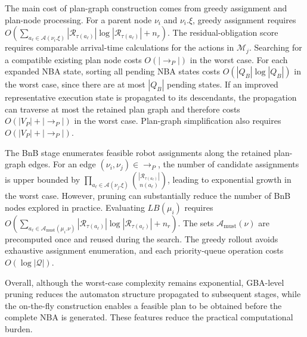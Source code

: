 \documentclass[lettersize,journal]{IEEEtran}
\theoremstyle{italiclemma}
\theoremstyle{italiclemma}
\theoremstyle{definition}
\begin{document}
The main cost of plan-graph construction comes from greedy assignment and plan-node processing. For a parent node $\nu_i$ and $\nu_i.\xi$, greedy assignment requires
$O(\sum_{a_\ell\in\mathcal A(\nu_i.\xi)}
|\mathcal R_{\tau(a_\ell)}|\log|\mathcal R_{\tau(a_\ell)}|+n_r)$. The residual-obligation score requires
comparable arrival-time calculations for the actions in $\mathcal M_j$. Searching for a compatible existing plan node costs $O(|\rightarrow_P|)$ in the worst case. For each expanded NBA state, sorting all pending NBA states costs $O(|Q_B|\log|Q_B|)$ in the worst case, since there are at most $|Q_B|$ pending states. If an improved representative execution state is propagated to its descendants, the propagation can traverse at most the retained plan graph and therefore costs $O(|V_P|+|\rightarrow_P|)$ in the worst case. Plan-graph simplification also requires $O(|V_P|+|\rightarrow_P|)$.

The BnB stage enumerates feasible robot assignments along the retained plan-graph edges. For an edge $(\nu_i,\nu_j)\in \rightarrow_P$, the number of candidate assignments is upper bounded by $\prod_{a_\ell\in\mathcal A(\nu_j.\xi)}
\binom{|\mathcal R_{\tau(a_\ell)}|}{n(a_\ell)}$, leading to exponential growth in the worst case. However, pruning can substantially reduce the number of BnB nodes explored in practice. Evaluating $LB(\mu_i)$ requires $O(\sum_{a_\ell\in\mathcal A_{\mathrm{must}}(\mu_i.\nu)}|\mathcal R_{\tau(a_\ell)}|\log|\mathcal R_{\tau(a_\ell)}|+n_r)$. The sets $\mathcal A_{\mathrm{must}}(\nu)$ are precomputed once and reused during the search. The greedy rollout avoids exhaustive assignment enumeration, and each priority-queue operation costs $O(\log|\mathcal Q|)$.

Overall, although the worst-case complexity remains exponential, GBA-level pruning reduces the automaton structure propagated to subsequent stages, while the on-the-fly construction enables a feasible plan to be obtained before the complete NBA is generated. These
features reduce the practical computational burden.


\end{document}
